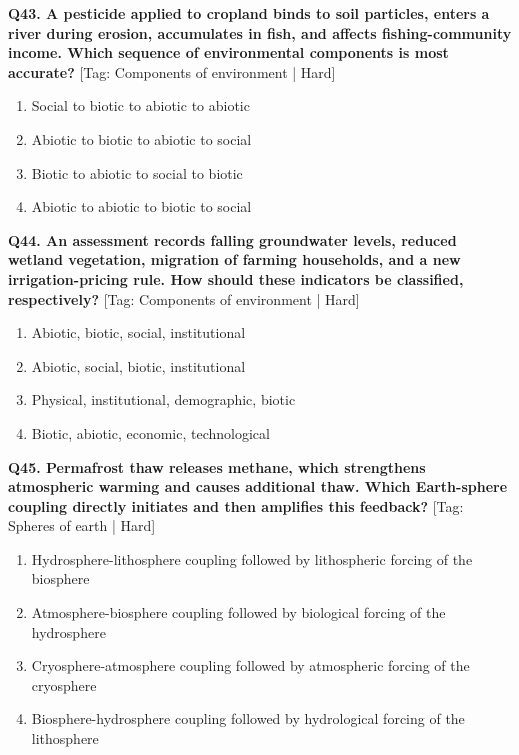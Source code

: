 \noindent\textbf{Q43. A pesticide applied to cropland binds to soil particles, enters a river during erosion, accumulates in fish, and affects fishing-community income. Which sequence of environmental components is most accurate?} \hfill [Tag: Components of environment | Hard]
\begin{enumerate}[label=(\alph*),topsep=2pt,itemsep=1pt,partopsep=0pt,parsep=0pt]
    \item {Social to biotic to abiotic to abiotic}
    \item {Abiotic to biotic to abiotic to social}
    \item {Biotic to abiotic to social to biotic}
    \item {Abiotic to abiotic to biotic to social}
\end{enumerate}
\vspace{2mm}

\noindent\textbf{Q44. An assessment records falling groundwater levels, reduced wetland vegetation, migration of farming households, and a new irrigation-pricing rule. How should these indicators be classified, respectively?} \hfill [Tag: Components of environment | Hard]
\begin{enumerate}[label=(\alph*),topsep=2pt,itemsep=1pt,partopsep=0pt,parsep=0pt]
    \item {Abiotic, biotic, social, institutional}
    \item {Abiotic, social, biotic, institutional}
    \item {Physical, institutional, demographic, biotic}
    \item {Biotic, abiotic, economic, technological}
\end{enumerate}
\vspace{2mm}

\noindent\textbf{Q45. Permafrost thaw releases methane, which strengthens atmospheric warming and causes additional thaw. Which Earth-sphere coupling directly initiates and then amplifies this feedback?} \hfill [Tag: Spheres of earth | Hard]
\begin{enumerate}[label=(\alph*),topsep=2pt,itemsep=1pt,partopsep=0pt,parsep=0pt]
    \item {Hydrosphere-lithosphere coupling followed by lithospheric forcing of the biosphere}
    \item {Atmosphere-biosphere coupling followed by biological forcing of the hydrosphere}
    \item {Cryosphere-atmosphere coupling followed by atmospheric forcing of the cryosphere}
    \item {Biosphere-hydrosphere coupling followed by hydrological forcing of the lithosphere}
\end{enumerate}
\vspace{2mm}

